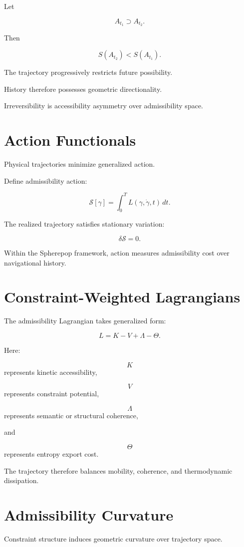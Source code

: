 \documentclass[12pt,openany]{book}
\theoremstyle{plain}
\theoremstyle{definition}
\theoremstyle{remark}
\begin{document}
Let

\[
A_{t_1}
\supset
A_{t_2}.
\]

Then

\[
S(A_{t_2})
<
S(A_{t_1}).
\]

The trajectory progressively restricts future possibility.

History therefore possesses geometric directionality.

Irreversibility is accessibility asymmetry over admissibility
space.

\section{Action Functionals}

Physical trajectories minimize generalized action.

Define admissibility action:

\[
\mathcal{S}[\gamma]
=
\int_0^T
L(\gamma,\dot\gamma,t)\,dt.
\]

The realized trajectory satisfies stationary variation:

\[
\delta\mathcal{S}
=
0.
\]

Within the Spherepop framework, action measures admissibility
cost over navigational history.

\section{Constraint-Weighted Lagrangians}

The admissibility Lagrangian takes generalized form:

\[
L
=
K
-
V
+
\Lambda
-
\Theta.
\]

Here:

\[
K
\]
represents kinetic accessibility,

\[
V
\]
represents constraint potential,

\[
\Lambda
\]
represents semantic or structural coherence,

and

\[
\Theta
\]
represents entropy export cost.

The trajectory therefore balances mobility, coherence, and
thermodynamic dissipation.

\section{Admissibility Curvature}

Constraint structure induces geometric curvature over trajectory
space.
\end{document}
